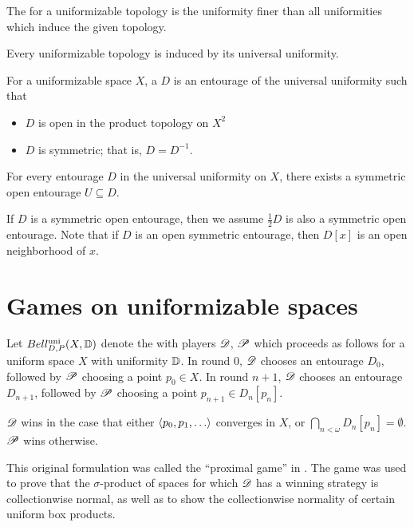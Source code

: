 \begin{defn}
  The  for a uniformizable topology is the uniformity
  finer than all uniformities which induce the given topology.
\end{defn}

\begin{thm}
  Every uniformizable topology is induced by its universal uniformity.
\end{thm}

\begin{defn}
  For a uniformizable space $X$, a  $D$ is an
  entourage of the universal uniformity such that
  \begin{itemize}
    \item $D$ is open in the product topology on $X^2$
    \item $D$ is symmetric; that is, $D=D^{-1}$.
  \end{itemize}
\end{defn}

\begin{thm}
  For every entourage $D$ in the universal uniformity on $X$, there exists a
  symmetric open entourage $U\subseteq D$.
\end{thm}

If $D$ is a symmetric open entourage, then we assume $\frac{1}{2}D$ is
also a symmetric open entourage. Note that if $D$ is an open symmetric
entourage, then $D[x]$ is an open neighborhood of $x$.


\section{Games on uniformizable spaces}

\begin{game}
  Let $Bell_{D,P}^{\textrm{uni}}(X, \mathbb{D})$ denote the  with
  players $\mathscr{D}$, $\mathscr{P}$ which
  proceeds as follows for a uniform space $X$ with uniformity $\mathbb{D}$. In round
  $0$, $\mathscr{D}$ chooses an entourage $D_0$, followed by $\mathscr{P}$ choosing a point
  $p_0\in X$. In round $n+1$, $\mathscr{D}$ chooses an entourage $D_{n+1}$, followed
  by $\mathscr{P}$ choosing a point $p_{n+1}\in D_n[p_n]$.

  $\mathscr{D}$ wins in the case that either $\<p_0,p_1,\dots\>$ converges in $X$,
  or $\bigcap_{n<\omega}D_n[p_n] = \emptyset$. $\mathscr{P}$ wins otherwise.
\end{game}

This original formulation was called the ``proximal game'' in \cite{MR3239205}.
The game was used to prove that the
$\sigma$-product of spaces for which $\mathscr{D}$ has a winning strategy is
collectionwise normal, as well as to show the collectionwise normality
of certain uniform box products.

